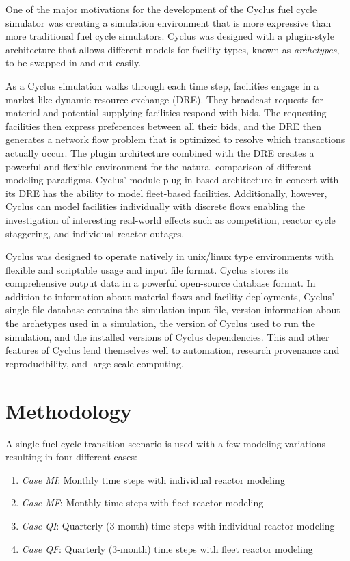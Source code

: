\documentclass{style}
\begin{document}
One of the major motivations for the development of the Cyclus fuel cycle
simulator \cite{cyclus_2015} was creating a simulation environment that is
more expressive than more traditional fuel cycle simulators.  Cyclus was
designed with a plugin-style architecture that allows different models for
facility types, known as \emph{archetypes}, to be swapped in and out easily.

As a Cyclus simulation walks through each time step, facilities engage in a
market-like dynamic resource exchange (DRE).  They broadcast requests for
material and potential supplying facilities respond with bids. The requesting facilities then
express preferences between all their bids, and the DRE then generates a network
flow problem that is optimized to resolve which transactions actually occur.
The plugin architecture combined with the DRE creates a powerful and flexible
environment for the natural comparison of different modeling paradigms.
Cyclus' module plug-in based architecture in concert with its DRE has the ability to
model fleet-based facilities.  Additionally, however, Cyclus can model
facilities individually with discrete flows enabling the investigation of
interesting real-world effects such as competition, reactor cycle staggering,
and individual reactor outages. 

Cyclus was designed to operate natively in unix/linux type environments with
flexible and scriptable usage and input file format.  Cyclus stores its
comprehensive output data in a powerful open-source database format.  In addition
to information about material flows and facility deployments, Cyclus'
single-file database contains the simulation input file, version information
about the archetypes used in a simulation, the version of Cyclus used to run
the simulation, and the installed versions of Cyclus dependencies. This and
other features of Cyclus lend themselves well to automation, research
provenance and reproducibility, and large-scale computing.

\section{Methodology}

A single fuel cycle transition scenario is used with a few modeling variations
resulting in four different cases:

\begin{enumerate}

    \item \emph{Case MI}: Monthly time steps with individual reactor modeling
    \item \emph{Case MF}: Monthly time steps with fleet reactor modeling
    \item \emph{Case QI}: Quarterly (3-month) time steps with individual reactor modeling
    \item \emph{Case QF}: Quarterly (3-month) time steps with fleet reactor modeling

\end{enumerate}
\end{document}
